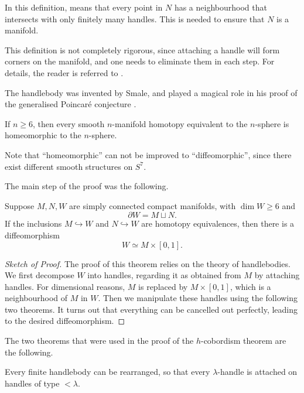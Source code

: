 In this definition,  means that 
every point in $N$ has a neighbourhood that intersects 
with only finitely many handles.
This is needed to ensure that $N$ is a manifold.

This definition is not completely rigorous,
since attaching a handle will form corners on the manifold,
and one needs to eliminate them in each step.
For details, the reader is referred to \cite{wall}.

The handlebody was invented by Smale,
and played a magical role in his proof of the
generalised Poincar\'e conjecture \cite{smale}.

\begin{theorem}
    If $n\geq6$, then every smooth $n$-manifold
    homotopy equivalent to the $n$-sphere
    is homeomorphic to the $n$-sphere.
\end{theorem}

Note that ``homeomorphic'' can not be improved to ``diffeomorphic'',
since there exist different smooth structures on $S^7$.

The main step of the proof was the following.

\begin{theorem}
    Suppose $M,N,W$ are simply connected compact manifolds, with $\dim W\geq6$ and 
    \[ \partial W = M \sqcup N. \]
    If the inclusions $M\hookrightarrow W$ and $N\hookrightarrow W$
    are homotopy equivalences, then there is a diffeomorphism
    \[ W \simeq M \times [0,1]. \]
\end{theorem}

\begin{proof}[Sketch of Proof]
    The proof of this theorem relies on the theory of handlebodies.
    We first decompose $W$ into handles,
    regarding it as obtained from $M$ by attaching handles.
    For dimensional reasons, $M$ is replaced by $M\times[0,1]$,
    which is a neighbourhood of $M$ in $W$.
    Then we manipulate these handles using the following two theorems.
    It turns out that everything can be cancelled out perfectly,
    leading to the desired diffeomorphism.
\end{proof}

The two theorems that were used in the proof 
of the $h$-cobordism theorem are the following.

\begin{theorem}[Rearrangement] \label{thm-rearrangement}
    Every finite handlebody can be rearranged,
    so that every $\lambda$-handle is attached on handles
    of type $<\lambda$.
\end{theorem}

